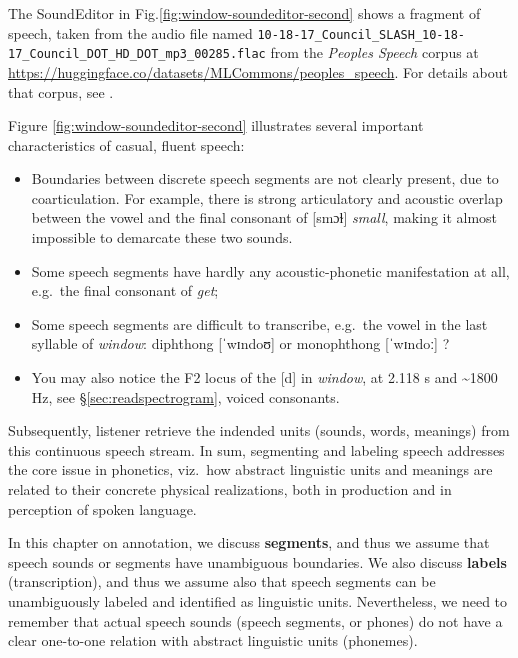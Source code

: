 \documentclass[
]{book}
\begin{document}
\protect{}\label{box-windowsfile-details-second}
The SoundEditor in Fig.\ref{fig:window-soundeditor-second} shows a fragment of speech, taken from the audio file named \texttt{10-18-17\_Council\_SLASH\_10-18-17\_Council\_DOT\_HD\_DOT\_mp3\_00285.flac} from the \emph{Peoples Speech} corpus at \url{https://huggingface.co/datasets/MLCommons/peoples_speech}. For details about that corpus, see \citet{Galvez_Diamos_Ciro_Cerón_Achorn_Gopi_Kanter_Lam_Mazumder_Reddi_2021}.

Figure \ref{fig:window-soundeditor-second} illustrates several important characteristics of casual, fluent speech:

\begin{itemize}
\item
  Boundaries between discrete speech segments are not clearly present, due to coarticulation. For example, there is strong articulatory and acoustic overlap between the vowel and the final consonant of {[}smɔɫ{]} \emph{small}, making it almost impossible to demarcate these two sounds.
\item
  Some speech segments have hardly any acoustic-phonetic manifestation at all, e.g.~the final consonant of \emph{get};
\item
  Some speech segments are difficult to transcribe, e.g.~the vowel in the last syllable of \emph{window}: diphthong {[}ˈwɪndoʊ{]} or monophthong {[}ˈwɪndoː{]} ?
\item
  You may also notice the F2 locus of the {[}d{]} in \emph{window}, at 2.118 s and \textasciitilde1800 Hz, see §\ref{sec:readspectrogram}, voiced consonants.
\end{itemize}

Subsequently, listener retrieve the indended units (sounds, words, meanings) from this continuous speech stream. In sum, segmenting and labeling speech addresses the core issue in phonetics, viz.~how abstract linguistic units and meanings are related to their concrete physical realizations, both in production and in perception of spoken language.

In this chapter on annotation, we discuss \textbf{segments}, and thus we assume that speech sounds or segments have unambiguous boundaries. We also discuss \textbf{labels} (transcription), and thus we assume also that speech segments can be unambiguously labeled and identified as linguistic units. Nevertheless, we need to remember that actual speech sounds (speech segments, or phones) do not have a clear one-to-one relation with abstract linguistic units (phonemes).
\end{document}
